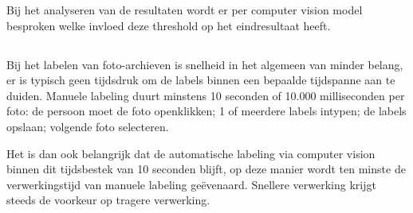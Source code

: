 Bij het analyseren van de resultaten wordt er per computer vision model besproken welke invloed deze threshold op het eindresultaat heeft. 

\subsection{}
\label{sec:scoren-of-speed}
Bij het labelen van foto-archieven is snelheid in het algemeen van minder belang, er is typisch geen tijdsdruk om de labels binnen een bepaalde tijdspanne aan te duiden. Manuele labeling duurt minstens 10 seconden of 10.000 milliseconden per foto: de persoon moet de foto openklikken; 1 of meerdere labels intypen; de labels opslaan; volgende foto selecteren. 

Het is dan ook belangrijk dat de automatische labeling via computer vision binnen dit tijdsbestek van 10 seconden blijft, op deze manier wordt ten minste de verwerkingstijd van manuele labeling geëvenaard. Snellere verwerking krijgt steeds de voorkeur op tragere verwerking.
